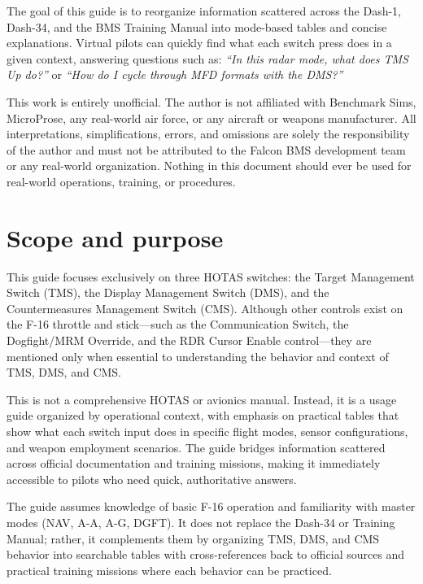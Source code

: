 \documentclass[11pt, a4paper, twoside]{report}
\begin{document}
The goal of this guide is to reorganize information scattered across the Dash-1, Dash-34, and the BMS Training Manual into mode-based tables and concise explanations. Virtual pilots can quickly find what each switch press does in a given context, answering questions such as: \emph{``In this radar mode, what does TMS Up do?''} or \emph{``How do I cycle through MFD formats with the DMS?''}

This work is entirely unofficial. The author is not affiliated with Benchmark Sims, MicroProse, any real-world air force, or any aircraft or weapons manufacturer. All interpretations, simplifications, errors, and omissions are solely the responsibility of the author and must not be attributed to the Falcon BMS development team or any real-world organization. Nothing in this document should ever be used for real-world operations, training, or procedures.

\section{Scope and purpose}
\label{sec:C1-S1}

This guide focuses exclusively on three HOTAS switches: the Target Management Switch (TMS), the Display Management Switch (DMS), and the Countermeasures Management Switch (CMS). Although other controls exist on the F-16 throttle and stick---such as the Communication Switch, the Dogfight/MRM Override, and the RDR Cursor Enable control---they are mentioned only when essential to understanding the behavior and context of TMS, DMS, and CMS.

This is not a comprehensive HOTAS or avionics manual. Instead, it is a usage guide organized by operational context, with emphasis on practical tables that show what each switch input does in specific flight modes, sensor configurations, and weapon employment scenarios. The guide bridges information scattered across official documentation and training missions, making it immediately accessible to pilots who need quick, authoritative answers.

The guide assumes knowledge of basic F-16 operation and familiarity with master modes (NAV, A-A, A-G, DGFT). It does not replace the Dash-34 or Training Manual; rather, it complements them by organizing TMS, DMS, and CMS behavior into searchable tables with cross-references back to official sources and practical training missions where each behavior can be practiced.
\end{document}
